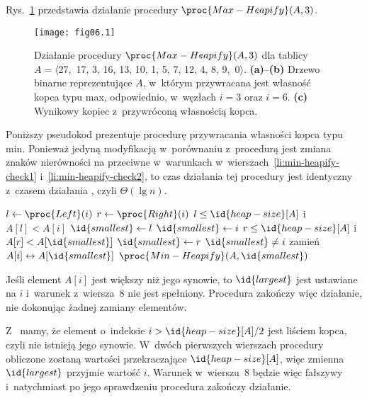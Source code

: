 
\exercise %
Rys.~\ref{fig:6.2-1} przedstawia działanie procedury $\proc{Max-Heapify}(A,3)$.
\begin{figure}[ht]
	\begin{center}
		\texttt{[image: fig06.1]}
	\end{center}
	\caption{Działanie procedury $\proc{Max-Heapify}(A,3)$ dla tablicy $A=\langle$27,~17, 3, 16, 13, 10, 1, 5, 7, 12, 4, 8, 9,~0$\rangle$. {\sffamily\bfseries(a)}--{\sffamily\bfseries(b)} Drzewo binarne reprezentujące $A$, w~którym przywracana jest własność kopca typu max, odpowiednio, w~węzłach $i=3$ oraz $i=6$. {\sffamily\bfseries(c)} Wynikowy kopiec z~przywróconą własnością kopca.} \label{fig:6.2-1}
\end{figure}

\exercise %
Poniższy pseudokod prezentuje procedurę przywracania własności kopca typu min. Ponieważ jedyną modyfikacją w~porównaniu z~procedurą  jest zmiana znaków nierówności na przeciwne w~warunkach w~wierszach~\ref{li:min-heapify-check1} i~\ref{li:min-heapify-check2}, to czas działania tej procedury jest identyczny z~czasem działania , czyli $\Theta(\lg n)$.
\begin{codebox}
\li	$l\gets\proc{Left}(i)$
\li	$r\gets\proc{Right}(i)$
\li	\If $l\le\id{heap-size}[A]$ i~$A[l]<A[i]$ \label{li:min-heapify-check1}
\li		\Then $\id{smallest}\gets l$
\li		\Else $\id{smallest}\gets i$
		\End
\li	\If $r\le\id{heap-size}[A]$ i~$A[r]<A[\id{smallest}]$ \label{li:min-heapify-check2}
\li		\Then $\id{smallest}\gets r$
		\End
\li	\If $\id{smallest}\ne i$
\li		\Then
			zamień $A[i]\leftrightarrow A[\id{smallest}]$
\li			$\proc{Min-Heapify}(A,\id{smallest})$
		\End
\end{codebox}

\exercise %
Jeśli element $A[i]$ jest większy niż jego synowie, to $\id{largest}$ jest ustawiane na $i$ i~warunek z~wiersza~8 nie jest spełniony. Procedura zakończy więc działanie, nie dokonując żadnej zamiany elementów.

\exercise %
Z~ mamy, że element o~indeksie $i>\id{heap-size}[A]/2$ jest liściem kopca, czyli nie istnieją jego synowie. W~dwóch pierwszych wierszach procedury  obliczone zostaną wartości przekraczające $\id{heap-size}[A]$, więc zmienna $\id{largest}$ przyjmie wartość $i$. Warunek w~wierszu~8 będzie więc fałszywy i~natychmiast po jego sprawdzeniu procedura zakończy działanie.

